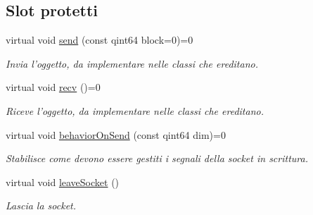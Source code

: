 \subsection*{Slot protetti}
\begin{DoxyCompactItemize}
\item 
virtual void \hyperlink{class_k_cloud_1_1_net_object_a43937ecaf65749a2c44e5c1c7a0d17dc}{send} (const qint64 block=0)=0
\begin{DoxyCompactList}\small\item\em Invia l'oggetto, da implementare nelle classi che ereditano. \end{DoxyCompactList}\item 
virtual void \hyperlink{class_k_cloud_1_1_net_object_a8ce9c6148bb53529b2b23d72bfe69e00}{recv} ()=0
\begin{DoxyCompactList}\small\item\em Riceve l'oggetto, da implementare nelle classi che ereditano. \end{DoxyCompactList}\item 
virtual void \hyperlink{class_k_cloud_1_1_net_object_ab2485b3e091565ade1f299ccff48ab5a}{behavior\-On\-Send} (const qint64 dim)=0
\begin{DoxyCompactList}\small\item\em Stabilisce come devono essere gestiti i segnali della socket in scrittura. \end{DoxyCompactList}\item 
virtual void \hyperlink{class_k_cloud_1_1_net_object_a6d1a31ad0d46aebc29940737c288234a}{leave\-Socket} ()
\begin{DoxyCompactList}\small\item\em Lascia la socket. \end{DoxyCompactList}\end{DoxyCompactItemize}
